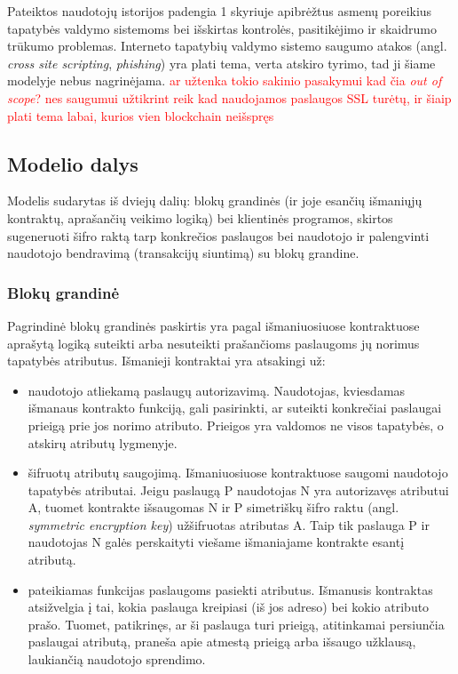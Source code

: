 Pateiktos naudotojų istorijos padengia 1 skyriuje apibrėžtus asmenų poreikius tapatybės valdymo
sistemoms bei išskirtas kontrolės, pasitikėjimo ir skaidrumo trūkumo problemas. Interneto tapatybių valdymo sistemo saugumo atakos (angl.
\textit{cross site scripting}, \textit{phishing}) yra plati tema, verta atskiro tyrimo, tad ji šiame modelyje nebus nagrinėjama. \textcolor{red}{ar užtenka tokio sakinio pasakymui kad čia \textit{out of scope}? nes saugumui užtikrint reik
kad naudojamos paslaugos SSL turėtų, ir šiaip plati tema labai, kurios vien blockchain neišspręs}

\subsection{Modelio dalys}

Modelis sudarytas iš dviejų dalių: blokų grandinės (ir joje esančių išmaniųjų kontraktų, aprašančių veikimo logiką)
bei klientinės programos, skirtos sugeneruoti šifro raktą tarp konkrečios paslaugos bei naudotojo ir palengvinti naudotojo bendravimą
(transakcijų siuntimą) su blokų grandine.

\subsubsection{Blokų grandinė} \label{BCIDM:blockchainFunctions}

Pagrindinė blokų grandinės paskirtis yra pagal išmaniuosiuose kontraktuose aprašytą logiką suteikti arba nesuteikti
prašančioms paslaugoms jų norimus tapatybės atributus. Išmanieji kontraktai yra atsakingi už:

\begin{itemize}
    \item naudotojo atliekamą paslaugų autorizavimą. Naudotojas, kviesdamas išmanaus kontrakto funkciją, gali pasirinkti,
    ar suteikti konkrečiai paslaugai prieigą prie jos norimo atributo. Prieigos yra valdomos ne visos tapatybės, o
    atskirų atributų lygmenyje.

    \item šifruotų atributų saugojimą. Išmaniuosiuose kontraktuose saugomi naudotojo tapatybės atributai. Jeigu paslaugą P
    naudotojas N yra autorizavęs atributui A, tuomet kontrakte išsaugomas N ir P simetriškų šifro raktu (angl.
    \textit{symmetric encryption key}) užšifruotas atributas A. Taip tik paslauga P
    ir naudotojas N galės perskaityti viešame išmaniajame kontrakte esantį atributą.

    \item pateikiamas funkcijas paslaugoms pasiekti atributus. Išmanusis kontraktas atsižvelgia į tai, kokia paslauga kreipiasi (iš
    jos adreso) bei kokio atributo prašo. Tuomet, patikrinęs, ar ši paslauga turi prieigą, atitinkamai persiunčia
    paslaugai atributą, praneša apie atmestą prieigą arba išsaugo užklausą, laukiančią naudotojo sprendimo.
\end{itemize}

